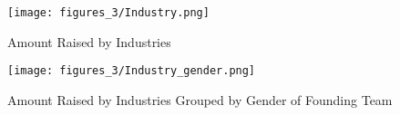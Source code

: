 
\begin{figure}
 \captionsetup{justification=raggedright,singlelinecheck=false}
\caption{Amount Raised by Industries}
\texttt{[image: figures\_3/Industry.png]} 
\end{figure}


\begin{figure}
 \captionsetup{justification=raggedright,singlelinecheck=false}
\caption{Amount Raised by Industries Grouped by Gender of Founding Team }
\texttt{[image: figures\_3/Industry\_gender.png]} 
\end{figure}


